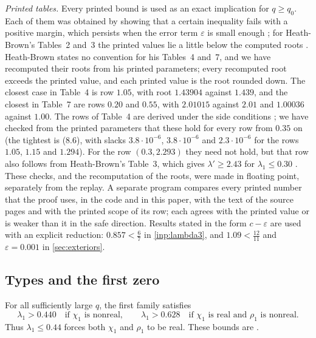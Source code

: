 \documentclass[11pt]{amsart}
\numberwithin{equation}{section}
\theoremstyle{plain}
\theoremstyle{definition}
\theoremstyle{remark}
\newcommand{\eps}{\varepsilon}
\newcommand{\1}{\mathbf{1}}
\begin{document}
\emph{Printed tables.} Every printed bound is used as an exact implication for $q\ge q_0$. Each
of them was obtained by showing that a certain inequality fails with a positive margin, which
persists when the error term $\eps$ is small enough \cite[p.~43, p.~44 and footnote~2 on
p.~45]{Xylouris2011nullstellen}; for Heath-Brown's Tables~2 and~3 the printed values lie a little below
the computed roots \cite[\S8]{HeathBrown1992zero}. Heath-Brown states no convention for his
Tables~4 and~7, and we have recomputed their roots from his printed parameters; every recomputed
root exceeds the printed value, and each printed value is the root rounded down. The closest case
in Table~4 is row $1.05$, with root $1.43904$ against $1.439$, and the closest in Table~7 are rows
$0.20$ and $0.55$, with $2.01015$ against $2.01$ and $1.00036$ against $1.00$. The
rows of Table~4 are derived under the side conditions \cite[(8.6), (8.8)]{HeathBrown1992zero}; we have
checked from the printed parameters that these hold for every row from $0.35$ on (the tightest is
(8.6), with slacks $3.8\cdot10^{-6}$, $3.8\cdot10^{-6}$ and $2.3\cdot10^{-6}$ for the rows $1.05$, $1.15$ and
$1.294$). For the row $(0.3,2.293)$ they need not hold, but that row also follows from Heath-Brown's
Table~3, which gives $\lambda'\ge2.43$ for $\lambda_1\le0.30$ \cite[\S8]{HeathBrown1992zero}. These checks, and the
recomputation of the roots, were made in floating point, separately from the replay. A separate
program compares every printed number that the proof uses, in the code and in this paper, with
the text of the source pages and with the printed scope of its row; each agrees with the printed
value or is weaker than it in the safe direction.
Results stated in the form $c-\eps$ are used with an explicit reduction: $0.857<\frac67$ in
\cref{inp:lambda3}, and $1.09<\frac{12}{11}$ and $\eps=0.001$ in \cref{sec:exteriors}.

\subsection{Types and the first zero}

\begin{proposition}\label{prop:firstlower}
For all sufficiently large $q$, the first family satisfies
\[
  \lambda_1>0.440\quad\text{if }\chi_1\text{ is nonreal},\qquad
  \lambda_1>0.628\quad\text{if }\chi_1\text{ is real and }\rho_1\text{ is nonreal}.
\]
Thus $\lambda_1\le0.44$ forces both $\chi_1$ and $\rho_1$ to be real.
These bounds are \cite[Lemma~4.5 and Table~11, pp.~60--61]{Xylouris2011nullstellen}.
\end{proposition}
\end{document}
